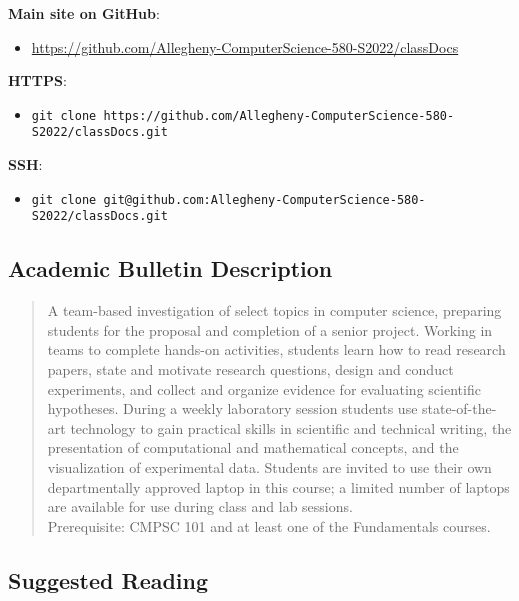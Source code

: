 \documentclass[11pt]{article} %
\begin{document}
\textbf{Main site on GitHub}: 
	\begin{itemize}
		\item \footnotesize \url{https://github.com/Allegheny-ComputerScience-580-S2022/classDocs}
	\end{itemize}

\textbf{HTTPS}: 
	\begin{itemize}
		\item {\tt \footnotesize git clone https://github.com/Allegheny-ComputerScience-580-S2022/classDocs.git}
	\end{itemize}

\textbf{SSH}: 
	\begin{itemize}
		\item {\tt \footnotesize git clone git@github.com:Allegheny-ComputerScience-580-S2022/classDocs.git}
	\end{itemize}



\subsection*{\textbf{Academic Bulletin Description}}

\begin{quote}

A team-based investigation of select topics in computer science, preparing students for the proposal and completion of a senior project. Working in teams to complete hands-on activities, students learn how to read research papers, state and motivate research questions, design and conduct experiments, and collect and organize evidence for evaluating scientific hypotheses. During a weekly laboratory session students use state-of-the-art technology to gain practical skills in scientific and technical writing, the presentation of computational and mathematical concepts, and the visualization of experimental data. Students are invited to use their own departmentally approved laptop in this course; a limited number of laptops are available for use during class and lab sessions.\\

Prerequisite: CMPSC 101 and at least one of the Fundamentals courses.

\end{quote}




\subsection*{\textbf{Suggested Reading}}
\end{document}
